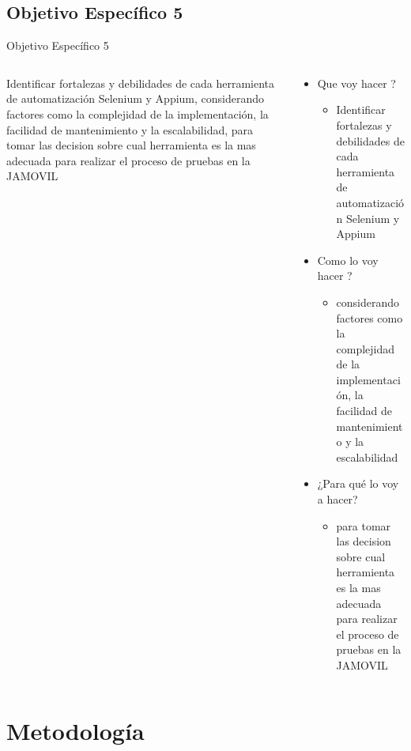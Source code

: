 \documentclass{beamer}
\begin{document}
\subsection{Objetivo Específico 5}
\begin{frame}{Objetivo Específico 5 }
  \begin{columns}
    \begin{column}{0.5\textwidth}
    \justify
      Identificar fortalezas y debilidades de cada herramienta de automatización Selenium y Appium, considerando factores como la complejidad de la implementación, la facilidad de mantenimiento y la escalabilidad, para tomar las decision sobre cual herramienta es la mas adecuada para realizar el proceso de pruebas en la JAMOVIL 
 
    \end{column}
    \begin{column}{0.5\textwidth}
    
      \begin{itemize}
      
          \item Que voy hacer ?
          \begin{itemize}
              \item Identificar fortalezas y debilidades de cada herramienta de automatización Selenium y Appium
          \end{itemize}
          \item Como lo voy hacer ?
          \begin{itemize}
              \item considerando factores como la complejidad de la implementación, la facilidad de mantenimiento y la escalabilidad
          \end{itemize}
         \item ¿Para qué lo voy a hacer?
         \begin{itemize}
              \item para tomar las decision sobre cual herramienta es la mas adecuada para realizar el proceso de pruebas en la JAMOVIL
          \end{itemize}
      \end{itemize}
    \end{column}
  \end{columns}
\end{frame}



\section{Metodología}
\end{document}
